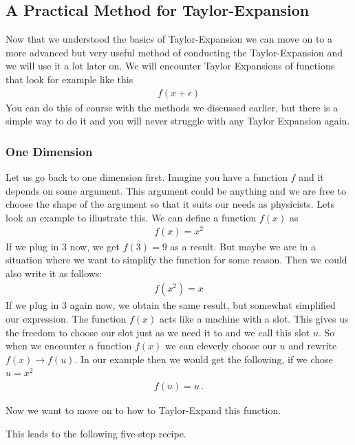 \subsection{A Practical Method for Taylor-Expansion}

Now that we understood the basics of Taylor-Expansion we can move on to a more
advanced but very useful method of conducting the Taylor-Expansion and we will
use it a lot later on. We will encounter Taylor Expansions of functions that look for example like this
\begin{align}
	f(x+\epsilon)
\end{align}
You can do this of course with the methods we discussed earlier, but there is a simple way to do it and you will never struggle with any Taylor Expansion again.

\subsubsection*{One Dimension}

Let us go back to one dimension first.  Imagine you have a function $f$ and it depends on some argument. This argument could be anything and we are free to choose the shape of the argument so that it suits our needs as physicists. Lets look an example to illustrate this.
We can define a function $f(x)$ as
\begin{align}
	f(x) = x^2
\end{align}
If we plug in $3$ now, we get $f(3)=9$ as a result.
But maybe we are in a situation where we want to simplify the function for some reason. Then we could also write it as follows:
\begin{align}
	f(x^2)=x
\end{align}
If we plug in $3$ again now, we obtain the same result, but somewhat simplified our expression. 
The function $f(x)$ acts like a machine with a slot. This gives us the freedom to choose our slot just as we need it to and we call this slot $u$. So when we encounter a function $f(x)$ we can cleverly choose our $u$ and rewrite $f(x)\rightarrow f(u)$.
In our example then we would get the following, if we chose $u=x^2$
\begin{align}
	f(u)=u\,.
\end{align}

Now we want to move on to how to Taylor-Expand this function.

 

\noindent This leads to the following five-step recipe.

